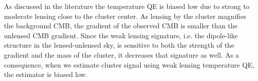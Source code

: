 \documentclass[prd, superscriptaddress, tightenlines, longbibliography, nofootinbib, eqsecnum, amsfonts, amsmath, floatfix, twocolumn, notitlepage]{revtex4-2}
\newcommand{\LL}[1]{{\color{orange}{LL: #1}}}
\newcommand{\bb}[1]{\textcolor{teal}{SS : #1}}
\begin{document}

As discussed in the literature \cite{Maturi:2004zj, Hu:2007bt} the temperature QE is biased low due to strong to moderate lensing close to the cluster center. 
As lensing by the cluster magnifies the background CMB, the gradient of the observed CMB is smaller than the unlensed CMB gradient.
Since the weak lensing signature, i.e. the dipole-like structure in the lensed-unlensed sky, is sensitive to both the strength of the gradient and the mass of the cluster, it decreases that signature as well. 
As a consequence, when we estimate cluster signal using weak lensing temperature QE, the estimator is biased low.
\end{document}
